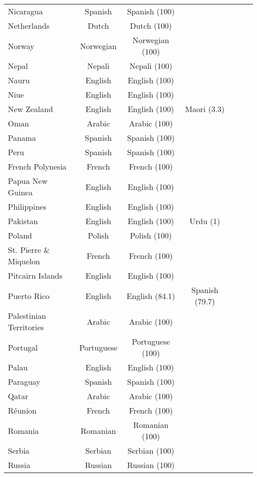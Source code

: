 \begin{longtable}{lc | c | c | c | c | c}
 Nicaragua & Spanish & Spanish (100) &   &   &   &   \\ 
 Netherlands & Dutch & Dutch (100) &   &   &   &   \\ 
 Norway & Norwegian & Norwegian (100) &   &   &   &   \\ 
 Nepal & Nepali & Nepali (100) &   &   &   &   \\ 
 Nauru & English & English (100) &   &   &   &   \\ 
 Niue & English & English (100) &   &   &   &   \\ 
 New Zealand & English & English (100) & Maori (3.3) &   &   &   \\ 
 Oman & Arabic & Arabic (100) &   &   &   &   \\ 
 Panama & Spanish & Spanish (100) &   &   &   &   \\ 
 Peru & Spanish & Spanish (100) &   &   &   &   \\ 
 French Polynesia & French & French (100) &   &   &   &   \\ 
 Papua New Guinea & English & English (100) &   &   &   &   \\ 
 Philippines & English & English (100) &   &   &   &   \\ 
 Pakistan & English & English (100) & Urdu (1) &   &   &   \\ 
 Poland & Polish & Polish (100) &   &   &   &   \\ 
 St. Pierre \& Miquelon & French & French (100) &   &   &   &   \\ 
 Pitcairn Islands & English & English (100) &   &   &   &   \\ 
 Puerto Rico & English & English (84.1) & Spanish (79.7) &   &   &   \\ 
 Palestinian Territories & Arabic & Arabic (100) &   &   &   &   \\ 
 Portugal & Portuguese & Portuguese (100) &   &   &   &   \\ 
 Palau & English & English (100) &   &   &   &   \\ 
 Paraguay & Spanish & Spanish (100) &   &   &   &   \\ 
 Qatar & Arabic & Arabic (100) &   &   &   &   \\ 
 Réunion & French & French (100) &   &   &   &   \\ 
 Romania & Romanian & Romanian (100) &   &   &   &   \\ 
 Serbia & Serbian & Serbian (100) &   &   &   &   \\ 
 Russia & Russian & Russian (100) &   &   &   &   \\ 

\end{longtable}
